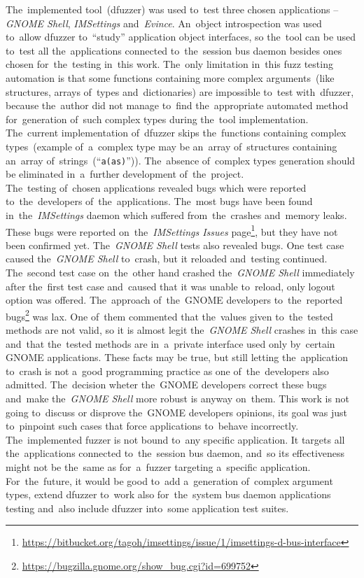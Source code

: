 The~implemented tool~(dfuzzer) was used to~test three chosen applications --
\emph{GNOME Shell}, \emph{IMSettings} and~\emph{Evince}. An~object introspection
was used to~allow dfuzzer to~``study'' application object interfaces, so
the~tool can be used to~test all the~applications connected to~the~session bus
daemon besides ones chosen for~the~testing in~this work. The~only limitation
in~this fuzz testing automation is that some functions containing more complex
arguments~(like structures, arrays of~types and~dictionaries) are impossible
to~test with~dfuzzer, because the~author did not manage to~find the~appropriate
automated method for~generation of~such complex types during the~tool implementation.
The~current implementation of~dfuzzer skips the~functions containing complex
types~(example of~a~complex type may be an~array of~structures containing an~array
of~strings~(``\texttt{a(as)}'')). The~absence of~complex types generation should
be eliminated in~a~further development of~the~project.\\

The~testing of~chosen applications revealed bugs which were reported
to~the~developers of~the~applications. The~most bugs have been found
in~the~\emph{IMSettings} daemon which suffered from~the~crashes and~memory leaks.
These bugs were reported on~the~\emph{IMSettings Issues} page\footnote{\url{https://bitbucket.org/tagoh/imsettings/issue/1/imsettings-d-bus-interface}}, but they have
not been confirmed yet. The~\emph{GNOME Shell} tests also revealed bugs. One test
case caused the~\emph{GNOME Shell} to~crash, but it reloaded and~testing continued.
The~second test case on~the~other hand crashed the~\emph{GNOME Shell} immediately
after the~first test case and~caused that it was unable to~reload, only logout
option was offered. The~approach of~the~GNOME developers to~the~reported
bugs\footnote{\url{https://bugzilla.gnome.org/show_bug.cgi?id=699752}} was lax.
One of~them commented that the~values given to~the~tested methods are not valid,
so it is almost legit the~\emph{GNOME Shell} crashes in~this case and~that
the~tested methods are in~a~private interface used only by~certain GNOME
applications. These facts may be true, but still letting the~application to~crash
is not a~good programming practice as one of~the~developers also admitted.
The~decision wheter the~GNOME developers correct these bugs and~make
the~\emph{GNOME Shell} more robust is anyway on~them. This work is not going
to~discuss or disprove the~GNOME developers opinions, its goal was just
to~pinpoint such cases that force applications to~behave incorrectly.\\

The~implemented fuzzer is not bound to~any specific application. It targets
all the~applications connected to~the~session bus daemon, and~so its effectiveness
might not be the~same as for~a~fuzzer targeting a~specific application.
For~the~future, it would be good to~add a~generation of~complex argument types,
extend dfuzzer to~work also for~the~system bus daemon applications testing
and~also include dfuzzer into~some application test suites.


